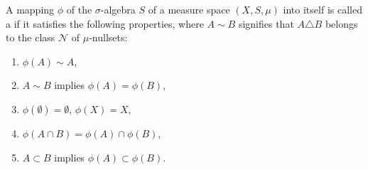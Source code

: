 A mapping $\phi$ of the $\sigma$-algebra $S$ of a measure space $(X, S, \mu)$ into itself is called a  if it satisfies the following properties, where $A \sim B$ signifies that $A \triangle B$ belongs to the class $\mathcal{N}$ of $\mu$-nullsets:
\begin{enumerate}
\item[1)] $\phi(A) \sim A$,
\item[2)] $A \sim B$ implies $\phi(A) = \phi(B)$,
\item[3)] $\phi(\emptyset) = \emptyset$, $\phi(X) = X$,
\item[4)] $\phi(A \cap B) = \phi(A) \cap \phi(B)$,
\item[5)] $A \subset B$ implies $\phi(A) \subset \phi(B)$.
\end{enumerate}
